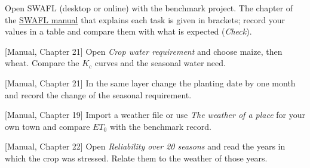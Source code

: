 {\small Open SWAFL (desktop or online) with the benchmark project. The chapter of the \href{https://github.com/halilunaziru73-creator/Coupled-Water-Fluxes-Pore-Scale-Dynamics-Precision-Irrigation-Mulching-Feedback-Loops/raw/main/Software/v1.1.0/SWAFL_Desktop/docs/manual_v1.1.0/SWAFL_Manual_v1.1.0.pdf}{SWAFL manual} that explains each task is given in brackets; record your values in a table and compare them with what is expected (\emph{Check}).}\par\vspace{3pt}
\begin{exlist}
\item {\color{khblue}[Manual, Chapter 21]} Open \emph{Crop water requirement} and choose maize, then wheat. Compare the $K_c$ curves and the seasonal water need.\par{}
\item {\color{khblue}[Manual, Chapter 21]} In the same layer change the planting date by one month and record the change of the seasonal requirement.\par{}
\item {\color{khblue}[Manual, Chapter 19]} Import a weather file or use \emph{The weather of a place} for your own town and compare $ET_0$ with the benchmark record.\par{}
\item {\color{khblue}[Manual, Chapter 22]} Open \emph{Reliability over 20 seasons} and read the years in which the crop was stressed. Relate them to the weather of those years.\par{}
\end{exlist}
